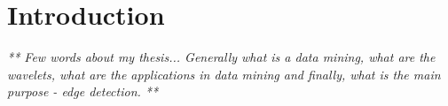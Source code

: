 \chapter*{Introduction}

\textit{ ** Few words about my thesis...
Generally what is a data mining, what are the wavelets, what are the applications in data mining and finally, what is the main purpose - edge detection. **}